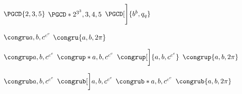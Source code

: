 \documentclass{article}
\title{\packtested}
\author{moi}
\def\esphor{\hspace{1cm}}
\begin{document}
%
\maketitle{}
%
$\PGCD{2,3,5}$
  \esphor  
$\PGCD*{2^{3^3},3,4,5}$
  \esphor  
$\PGCD[\Bigg]{b^b,q_q}$

\def\testb{c^{c^c}}
\def\testa{b,\testb}
\def\test{a,\testa}
$\congru\test$
  \esphor  
$\congru{a,b,2\pi}$

$\congrup\test$
  \esphor  
$\congrup*\test$
  \esphor  
$\congrup[\bigg]{a,b,c^{c^c}}$
  \esphor 
\SetCongruEq{=}  $\congrup{a,b,2\pi}$

$\congrub\test$
  \esphor  
$\congrub[\bigg]\test$
  \esphor  
$\congrub*{a,b,c^{c^c}}$
  \esphor  
$\congrub{a,b,2\pi}$
%
\end{document}
